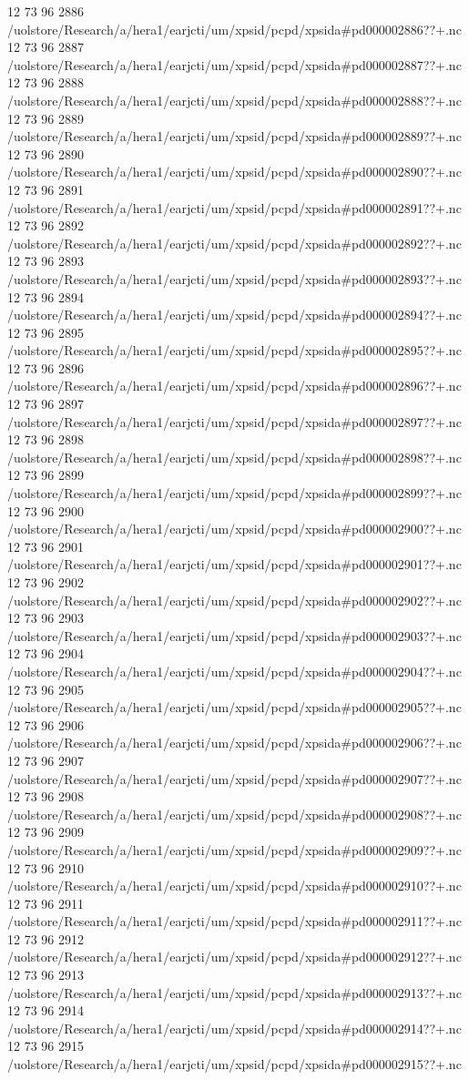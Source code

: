 12 73 96
2886
/uolstore/Research/a/hera1/earjcti/um/xpsid/pcpd/xpsida#pd000002886??+.nc
12 73 96
2887
/uolstore/Research/a/hera1/earjcti/um/xpsid/pcpd/xpsida#pd000002887??+.nc
12 73 96
2888
/uolstore/Research/a/hera1/earjcti/um/xpsid/pcpd/xpsida#pd000002888??+.nc
12 73 96
2889
/uolstore/Research/a/hera1/earjcti/um/xpsid/pcpd/xpsida#pd000002889??+.nc
12 73 96
2890
/uolstore/Research/a/hera1/earjcti/um/xpsid/pcpd/xpsida#pd000002890??+.nc
12 73 96
2891
/uolstore/Research/a/hera1/earjcti/um/xpsid/pcpd/xpsida#pd000002891??+.nc
12 73 96
2892
/uolstore/Research/a/hera1/earjcti/um/xpsid/pcpd/xpsida#pd000002892??+.nc
12 73 96
2893
/uolstore/Research/a/hera1/earjcti/um/xpsid/pcpd/xpsida#pd000002893??+.nc
12 73 96
2894
/uolstore/Research/a/hera1/earjcti/um/xpsid/pcpd/xpsida#pd000002894??+.nc
12 73 96
2895
/uolstore/Research/a/hera1/earjcti/um/xpsid/pcpd/xpsida#pd000002895??+.nc
12 73 96
2896
/uolstore/Research/a/hera1/earjcti/um/xpsid/pcpd/xpsida#pd000002896??+.nc
12 73 96
2897
/uolstore/Research/a/hera1/earjcti/um/xpsid/pcpd/xpsida#pd000002897??+.nc
12 73 96
2898
/uolstore/Research/a/hera1/earjcti/um/xpsid/pcpd/xpsida#pd000002898??+.nc
12 73 96
2899
/uolstore/Research/a/hera1/earjcti/um/xpsid/pcpd/xpsida#pd000002899??+.nc
12 73 96
2900
/uolstore/Research/a/hera1/earjcti/um/xpsid/pcpd/xpsida#pd000002900??+.nc
12 73 96
2901
/uolstore/Research/a/hera1/earjcti/um/xpsid/pcpd/xpsida#pd000002901??+.nc
12 73 96
2902
/uolstore/Research/a/hera1/earjcti/um/xpsid/pcpd/xpsida#pd000002902??+.nc
12 73 96
2903
/uolstore/Research/a/hera1/earjcti/um/xpsid/pcpd/xpsida#pd000002903??+.nc
12 73 96
2904
/uolstore/Research/a/hera1/earjcti/um/xpsid/pcpd/xpsida#pd000002904??+.nc
12 73 96
2905
/uolstore/Research/a/hera1/earjcti/um/xpsid/pcpd/xpsida#pd000002905??+.nc
12 73 96
2906
/uolstore/Research/a/hera1/earjcti/um/xpsid/pcpd/xpsida#pd000002906??+.nc
12 73 96
2907
/uolstore/Research/a/hera1/earjcti/um/xpsid/pcpd/xpsida#pd000002907??+.nc
12 73 96
2908
/uolstore/Research/a/hera1/earjcti/um/xpsid/pcpd/xpsida#pd000002908??+.nc
12 73 96
2909
/uolstore/Research/a/hera1/earjcti/um/xpsid/pcpd/xpsida#pd000002909??+.nc
12 73 96
2910
/uolstore/Research/a/hera1/earjcti/um/xpsid/pcpd/xpsida#pd000002910??+.nc
12 73 96
2911
/uolstore/Research/a/hera1/earjcti/um/xpsid/pcpd/xpsida#pd000002911??+.nc
12 73 96
2912
/uolstore/Research/a/hera1/earjcti/um/xpsid/pcpd/xpsida#pd000002912??+.nc
12 73 96
2913
/uolstore/Research/a/hera1/earjcti/um/xpsid/pcpd/xpsida#pd000002913??+.nc
12 73 96
2914
/uolstore/Research/a/hera1/earjcti/um/xpsid/pcpd/xpsida#pd000002914??+.nc
12 73 96
2915
/uolstore/Research/a/hera1/earjcti/um/xpsid/pcpd/xpsida#pd000002915??+.nc
